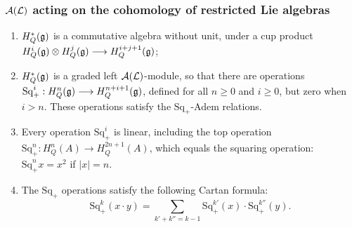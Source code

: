 \documentclass[10pt]{article}
\newcommand{\SqShift}{\Sq_{+}}
\newcommand{\Sq}{\mathrm{Sq}}
\newcommand{\LieSteen}{\calA(\calL)}
\begin{document}
\begin{SteenrodAlgebrasAndTheirKoszulDuals}
\subsubsection{$\LieSteen$ acting on the cohomology of restricted Lie algebras}
\begin{enumerate}\squishlist
\setlength{\parindent}{.25in}
\item $H^*_Q(\mathfrak{g})$ is a commutative algebra without unit, under a cup product $H^i_Q(\mathfrak{g})\otimes H^j_Q(\mathfrak{g})\longrightarrow H^{i+j+1}_Q(\mathfrak{g})$;
\item $H^*_Q(\mathfrak{g})$ is a graded left $\LieSteen$-module, so that there are operations $\SqShift^i:H^n_Q(\frakg)\to H^{n+i+1}_Q(\frakg)$, defined for all $n\geq0$ and $i\geq0$, but zero when $i>n$. These operations satisfy the $\SqShift$-Adem relations.
\item Every operation $\SqShift^i$ is linear, including the top operation $\SqShift^n:H^n_Q(A)\to H^{2n+1}_Q(A)$, which equals the squaring operation:  $\SqShift^nx=x^2$ if $|x|=n$.
\item The $\SqShift$ operations satisfy the following Cartan formula:
\[\SqShift^k(x\cdot y)=\sum_{k'+k''=k-1}\SqShift^{k'}(x)\cdot \SqShift^{k''}(y).\]
\end{enumerate}


\end{SteenrodAlgebrasAndTheirKoszulDuals}
\end{document}

